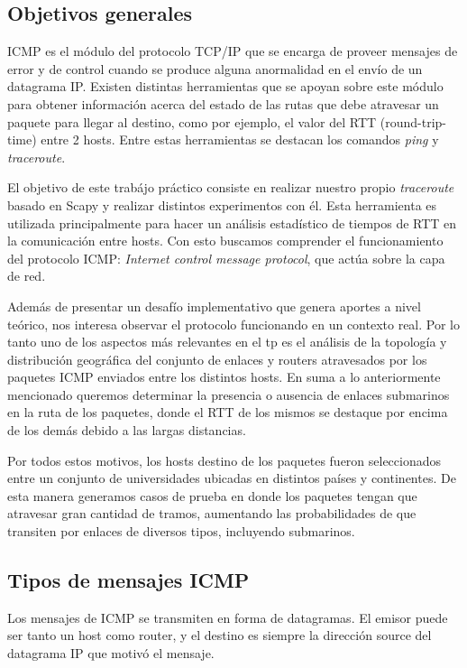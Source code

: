\subsection{Objetivos generales}

ICMP es el módulo del protocolo TCP/IP que se encarga de proveer mensajes de error y de control cuando
se produce alguna anormalidad en el envío de un datagrama IP. Existen distintas herramientas
que se apoyan sobre este módulo para obtener información acerca del estado de las rutas que
debe atravesar un paquete para llegar al destino, como por ejemplo, el valor del RTT (round-trip-time)
entre 2 hosts. Entre estas herramientas se destacan los comandos \emph{ping} y \emph{traceroute}.

El objetivo de este trab\'ajo pr\'actico consiste en realizar nuestro propio
\emph{traceroute} basado en Scapy y realizar distintos experimentos con él.
Esta herramienta es utilizada principalmente para hacer un an\'alisis estad\'istico de tiempos
de RTT en la comunicaci\'on entre hosts. Con esto buscamos comprender el funcionamiento del protocolo
ICMP: \emph{Internet control message protocol}, que actúa sobre la capa de red.

Además de presentar un desafío implementativo que genera aportes a nivel teórico, nos interesa
observar el protocolo funcionando en un contexto real. Por lo tanto uno de los aspectos
más relevantes en el tp es el análisis de la topología y distribución geográfica del conjunto de enlaces
y routers atravesados por los paquetes ICMP enviados entre los distintos hosts. En suma a lo
anteriormente mencionado queremos determinar la presencia o ausencia de enlaces submarinos en
la ruta de los paquetes, donde el RTT de los mismos se destaque por encima de los
demás debido a las largas distancias.

Por todos estos motivos, los hosts destino de los paquetes fueron seleccionados entre un conjunto de universidades ubicadas en distintos países y continentes. De esta manera generamos casos de
prueba en donde los paquetes tengan que atravesar gran cantidad de tramos,
aumentando las probabilidades de que transiten por enlaces de diversos tipos, incluyendo submarinos.


\subsection{Tipos de mensajes ICMP}

Los mensajes de ICMP se transmiten en forma de datagramas. El emisor puede ser tanto un host como router,
y el destino es siempre la dirección source del datagrama IP que motivó el mensaje.


